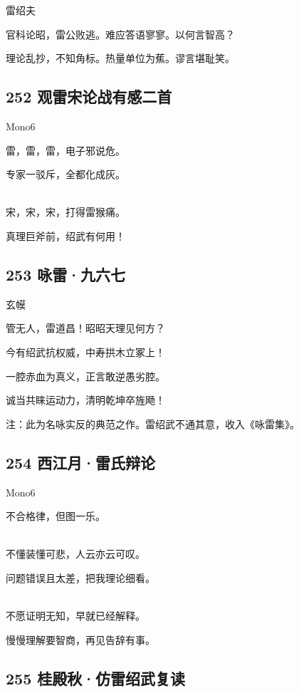 {雷绍夫}

官科论昭，雷公败逃。难应答语寥寥。以何言智高？

理论乱抄，不知角标。热量单位为蕉。谬言堪耻笑。

\hypertarget{ux89c2ux96f7ux5b8bux8bbaux6218ux6709ux611fux4e8cux9996}{%
\subsection{252
观雷宋论战有感二首}\label{ux89c2ux96f7ux5b8bux8bbaux6218ux6709ux611fux4e8cux9996}}

{Mono6}

雷，雷，雷，电子邪说危。

专家一驳斥，全都化成灰。

~\\
宋，宋，宋，打得雷猴痛。

真理巨斧前，绍武有何用！

\hypertarget{ux548fux96f7ux4e5dux516dux4e03}{%
\subsection{253 咏雷·九六七}\label{ux548fux96f7ux4e5dux516dux4e03}}

{玄幙}

管无人，雷道昌！昭昭天理见何方？

今有绍武抗权威，中寿拱木立冢上！

一腔赤血为真义，正言敢逆愚劣腔。

诚当共睐运动力，清明乾坤卒旌飏！

注：此为名咏实反的典范之作。雷绍武不通其意，收入《咏雷集》。 ~\\

\hypertarget{ux897fux6c5fux6708ux96f7ux6c0fux8fa9ux8bba}{%
\subsection{254
西江月·雷氏辩论}\label{ux897fux6c5fux6708ux96f7ux6c0fux8fa9ux8bba}}

{Mono6}

不合格律，但图一乐。

~\\
不懂装懂可悲，人云亦云可叹。

问题错误且太差，把我理论细看。

~\\
不愿证明无知，早就已经解释。

慢慢理解要智商，再见告辞有事。

\hypertarget{ux6842ux6bbfux79cbux4effux96f7ux7ecdux6b66ux590dux8bfb}{%
\subsection{255
桂殿秋·仿雷绍武复读}\label{ux6842ux6bbfux79cbux4effux96f7ux7ecdux6b66ux590dux8bfb}}

